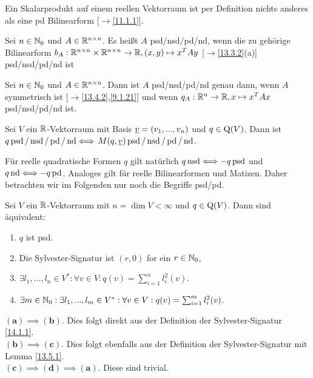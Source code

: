 \documentclass[../../main.tex]{subfiles}
\begin{document}
\begin{bsp}\label{14.2.2}
Ein Skalarprodukt auf einem reellen Vektorraum ist per Definition nichts anderes als eine pd Bilinearform [$\to$\ref{11.1.1}].
\end{bsp}
	
\begin{df}\label{14.2.3}
Sei $n\in \mathbb N_0$ und $A\in \mathbb R^{n\times n}$. Es heißt $A$ psd/nsd/pd/nd, wenn die zu gehörige Bilinearform $b_A: \mathbb R^{n\times n}\times \mathbb R^{n\times n}\to \mathbb R, (x,y)\mapsto x^TAy$ [$\to$\ref{13.3.2}(a)] psd/nsd/pd/nd ist
\end{df}

\begin{bem}\label{14.2.4}
Sei $n\in \mathbb N_0$ und $A\in \mathbb R^{n\times n}$. Dann ist $A$ psd/nsd/pd/nd genau dann, wenn $A$ symmetrisch ist [$\to$\ref{13.4.2},\ref{9.1.21}] und wenn $q_A: \mathbb R^n\to \mathbb R, x\mapsto x^TAx$ psd/nsd/pd/nd ist.
\end{bem}
	
\begin{bem}\label{14.2.5}
Sei $V$ ein $\mathbb R$-Vektorraum mit Basis ${\underline v}=(v_1,...,v_n)$ und $q\in\operatorname{Q}(V)$. Dann ist $q \operatorname{psd}/\operatorname{nsd}/\operatorname{pd}/\operatorname{nd} \Longleftrightarrow$ $M(q,{\underline v}) \operatorname{psd}/\operatorname{nsd}/\operatorname{pd}/\operatorname{nd}$.
\end{bem}

\begin{bem}\label{14.2.6}
Für reelle quadratische Formen $q$ gilt natürlich $q\operatorname{nsd}\Longleftrightarrow -q \operatorname{psd}$ und $q\operatorname{nd}\Longleftrightarrow -q \operatorname{pd}$. Analoges gilt für reelle Bilinearformen und Matizen. Daher betrachten wir im Folgenden nur noch die Begriffe psd/pd.
\end{bem}

\begin{sat}\label{14.2.7}
Sei $V$ ein $\mathbb R$-Vektorraum mit $n=\dim V<\infty$ und $q\in \operatorname{Q}(V)$. Dann sind äquivalent:
\begin{enumerate}[\normalfont(a)]
\item $q$ ist psd.
\item Die Sylvester-Signatur ist $(r,0)$ for ein $r\in \mathbb N_0$,
\item $\exists l_1,...,l_n\in V^*: \forall v\in V: q(v)=\sum_{i=1}^nl_i^2(v)$.
\item $\exists m\in \mathbb N_0:\exists l_1,...,l_m\in V^*: \forall v\in V: q(v)=\sum_{i=1}^ml_i^2(v)$.
\end{enumerate}
\end{sat}
\begin{cproof}
$\boldsymbol{(a)\implies(b)}$. Dies folgt direkt aus der Definition der Sylvester-Signatur \ref{14.1.1}.\\

\noindent$\boldsymbol{(b)\implies(c)}$. Dies folgt ebenfalls aus der Definition der Sylvester-Signatur mit Lemma \ref{13.5.1}.\\

\noindent $\boldsymbol{(c)\implies(d)\implies(a)}$. Diese sind trivial.
\end{cproof}
\end{document}
